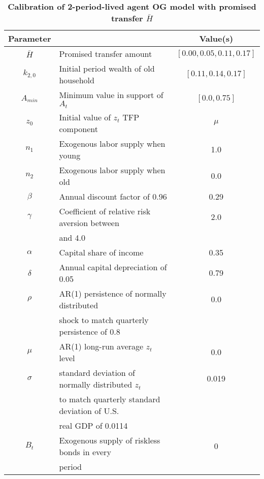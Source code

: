\documentclass[letterpaper,12pt]{article}
\theoremstyle{definition}
\begin{document}
\begin{spacing}{1.5}
  \begin{table}[htbp]\centering\captionsetup{width=5.6in}
  \caption{\label{TabCalibr}\textbf{Calibration of 2-period-lived agent OG model with promised transfer $\bar{H}$}}
      \begin{threeparttable}
      \begin{tabular}{>{\small}c >{\small}l >{\small}c}
          \hline\hline
          Parameter & \multicolumn{1}{c}{Source to match} & Value(s) \\
          \hline
          $\bar{H}$ & Promised transfer amount & $[0.00, 0.05, 0.11, 0.17]$ \\
          $k_{2,0}$ & Initial period wealth of old household & $[0.11, 0.14, 0.17]$ \\
          $A_{min}$ & Minimum value in support of $A_t$ & $[0.0, 0.75]$ \\
          \hline
          $z_0$ & Initial value of $z_t$ TFP component & $\mu$ \\
          $n_1$ & Exogenous labor supply when young & 1.0 \\
          $n_2$ & Exogenous labor supply when old & 0.0 \\
          $\beta$  & Annual discount factor of 0.96 & 0.29 \\
          $\gamma$ & Coefficient of relative risk aversion between &  2.0 \\
                   & \quad 1.5 and 4.0 &  \\
          $\alpha$ & Capital share of income &  0.35 \\
          $\delta$ & Annual capital depreciation of 0.05 & 0.79 \\
          $\rho$   & AR(1) persistence of normally distributed &  0.0 \\
                   & \quad shock to match quarterly persistence of 0.8 &       \\
          $\mu$    & AR(1) long-run average $z_t$ level &  0.0 \\
          $\sigma$ & standard deviation of normally distributed $z_t$ &  0.019 \\
                   & \quad to match quarterly standard deviation of U.S. &  \\
                   & \quad real GDP of 0.0114 & \\
          $B_t$    & Exogenous supply of riskless bonds in every & 0 \\
                   & \quad period & \\
          \hline

\end{tabular}
\end{threeparttable}
\end{table}
\end{spacing}
\end{document}
